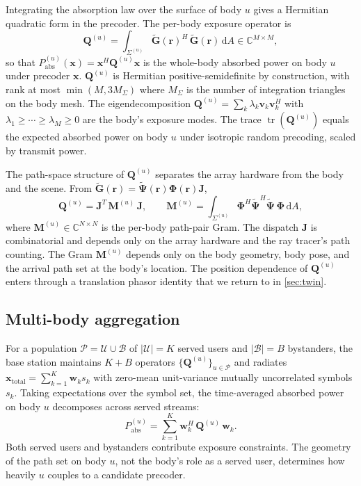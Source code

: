\documentclass[journal,twocolumn,10pt]{IEEEtran}
\theoremstyle{plain}
\theoremstyle{remark}
\newcommand{\rr}{\mathbf{r}}
\newcommand{\xx}{\mathbf{x}}
\newcommand{\ww}{\mathbf{w}}
\newcommand{\Pabs}{P_{\mathrm{abs}}}
\newcommand{\Gtil}{\tilde{\mathbf{G}}}
\newcommand{\Qmat}{\mathbf{Q}}
\newcommand{\Mmat}{\mathbf{M}}
\newcommand{\Jmat}{\mathbf{J}}
\newcommand{\Phimat}{\mathbf{\Phi}}
\newcommand{\Psitil}{\tilde{\bm{\Psi}}}
\newcommand{\diff}{\mathrm{d}}
\newcommand{\Complex}{\mathbb{C}}
\newcommand{\AllBodies}{\mathcal{P}}
\newcommand{\Served}{\mathcal{U}}
\newcommand{\Bystanders}{\mathcal{B}}
\DeclareMathOperator{\tr}{tr}
\begin{document}
Integrating the absorption law over the surface of body $u$ gives a
Hermitian quadratic form in the precoder. The per-body exposure
operator is
\begin{equation}\label{eq:Q-def}
  \Qmat^{(u)} = \int_{\Sigma^{(u)}} \Gtil(\rr)^H\,\Gtil(\rr)\,\diff A
  \in \Complex^{M \times M},
\end{equation}
so that $\Pabs^{(u)}(\xx) = \xx^H \Qmat^{(u)} \xx$ is the whole-body
absorbed power on body $u$ under precoder $\xx$. $\Qmat^{(u)}$ is
Hermitian positive-semidefinite by construction, with rank at most
$\min(M, 3 M_\Sigma)$ where $M_\Sigma$ is the number of integration
triangles on the body mesh. The eigendecomposition
$\Qmat^{(u)} = \sum_k \lambda_k \mathbf{v}_k \mathbf{v}_k^H$ with
$\lambda_1 \geq \cdots \geq \lambda_M \geq 0$ are the body's exposure
modes. The trace $\tr(\Qmat^{(u)})$ equals the expected absorbed
power on body $u$ under isotropic random precoding, scaled by
transmit power.

The path-space structure of $\Qmat^{(u)}$ separates the array
hardware from the body and the scene. From
$\Gtil(\rr) = \Psitil(\rr) \Phimat(\rr) \Jmat$,
\begin{equation}\label{eq:Q-factor}
  \Qmat^{(u)} = \Jmat^T\,\Mmat^{(u)}\,\Jmat,
  \qquad
  \Mmat^{(u)} = \int_{\Sigma^{(u)}} \Phimat^H \Psitil^H \Psitil\,
  \Phimat\,\diff A,
\end{equation}
where $\Mmat^{(u)} \in \Complex^{N \times N}$ is the per-body path-pair
Gram. The dispatch $\Jmat$ is combinatorial and depends only on the
array hardware and the ray tracer's path counting. The Gram
$\Mmat^{(u)}$ depends only on the body geometry, body pose, and the
arrival path set at the body's location. The position dependence of
$\Qmat^{(u)}$ enters through a translation phasor identity that we
return to in \cref{sec:twin}.

\subsection{Multi-body aggregation}\label{sec:aggregation}

For a population $\AllBodies = \Served \cup \Bystanders$ of $|\Served|
= K$ served users and $|\Bystanders| = B$ bystanders, the base station
maintains $K + B$ operators $\{\Qmat^{(u)}\}_{u \in \AllBodies}$ and
radiates $\xx_{\mathrm{total}} = \sum_{k=1}^K \ww_k s_k$ with
zero-mean unit-variance mutually uncorrelated symbols $s_k$. Taking
expectations over the symbol set, the time-averaged absorbed power
on body $u$ decomposes across served streams:
\begin{equation}\label{eq:Pabs-MU}
  \Pabs^{(u)} = \sum_{k=1}^K \ww_k^H\,\Qmat^{(u)}\,\ww_k.
\end{equation}
Both served users and bystanders contribute exposure constraints. The
geometry of the path set on body $u$, not the body's role as a
served user, determines how heavily $u$ couples to a candidate
precoder.
\end{document}
